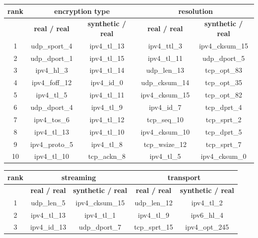 \documentclass[sigconf, nonacm]{acmart}
\begin{document}
\begin{table}[h!]
\centering
\begin{tabular}{|c|c|c|c|c|}
\hline
\textbf{rank} & \multicolumn{2}{c|}{\textbf{encryption type}} & \multicolumn{2}{c|}{\textbf{resolution}} \\ \hline
& \textbf{real / real} & \textbf{synthetic / real} & \textbf{real / real} & \textbf{synthetic / real} \\ \hline
1 & udp\_sport\_4 & \cellcolor[HTML]{02B021}ipv4\_tl\_13 & ipv4\_ttl\_3 & \cellcolor[HTML]{02B021}ipv4\_cksum\_15 \\ \hline
2 & udp\_dport\_1 & \cellcolor[HTML]{02B021}ipv4\_tl\_15 & ipv4\_tl\_11 & udp\_dport\_5 \\ \hline
3 & ipv4\_hl\_3 & \cellcolor[HTML]{02B021}ipv4\_tl\_14 & udp\_len\_13 & tcp\_opt\_83 \\ \hline
4 & ipv4\_foff\_12 & ipv4\_id\_0 & udp\_cksum\_14 & tcp\_opt\_35 \\ \hline
5 & ipv4\_tl\_5 & \cellcolor[HTML]{02B021}ipv4\_tl\_11 & ipv4\_cksum\_15 & tcp\_opt\_82 \\ \hline
6 & udp\_dport\_4 & \cellcolor[HTML]{02B021}ipv4\_tl\_9 & ipv4\_id\_7 & tcp\_dprt\_4 \\ \hline
7 & ipv4\_tos\_6 & \cellcolor[HTML]{02B021}ipv4\_tl\_12 & tcp\_seq\_10 & tcp\_sprt\_2 \\ \hline
8 & ipv4\_tl\_13 & \cellcolor[HTML]{02B021}ipv4\_tl\_10 & ipv4\_cksum\_10 & tcp\_dprt\_5 \\ \hline
9 & ipv4\_proto\_5 & \cellcolor[HTML]{02B021}ipv4\_tl\_8 & tcp\_wsize\_12 & tcp\_sprt\_7 \\ \hline
10 & ipv4\_tl\_10 & tcp\_ackn\_8 & ipv4\_tl\_5 & \cellcolor[HTML]{02B021}ipv4\_cksum\_0 \\ \hline
\end{tabular}
\begin{tabular}{|c|c|c|c|c|}
\hline
\textbf{rank} & \multicolumn{2}{c|}{\textbf{streaming}} & \multicolumn{2}{c|}{\textbf{transport}} \\ \hline
& \textbf{real / real} & \textbf{synthetic / real} & \textbf{real / real} & \textbf{synthetic / real} \\ \hline
1 & udp\_len\_5 & \cellcolor[HTML]{02B021}ipv4\_cksum\_15 & udp\_len\_12 & \cellcolor[HTML]{02B021}ipv4\_tl\_2 \\ \hline
2 & ipv4\_tl\_13 & \cellcolor[HTML]{02B021}ipv4\_tl\_1 & ipv4\_tl\_9 & ipv6\_hl\_4 \\ \hline
3 & ipv4\_id\_13 & udp\_dport\_7 & tcp\_sprt\_15 & ipv4\_opt\_245 \\ \hline

\end{tabular}
\end{table}
\end{document}
